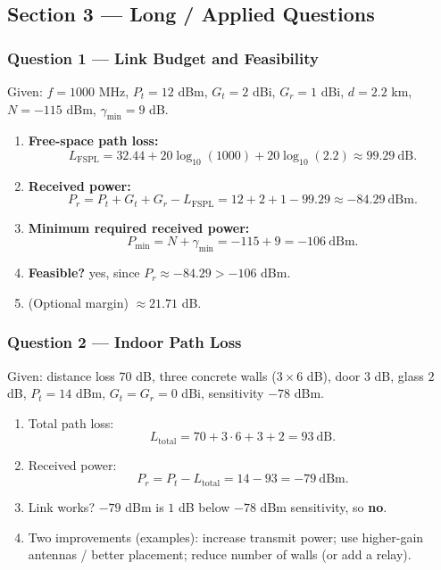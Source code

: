 \documentclass[11pt,a4paper]{article}
\begin{document}
\subsection*{Section 3 --- Long / Applied Questions}

\subsubsection*{Question 1 --- Link Budget and Feasibility}
Given: $f=1000$ MHz, $P_t=12$ dBm, $G_t=2$ dBi, $G_r=1$ dBi, $d=2.2$ km, $N=-115$ dBm, $\gamma_{\min}=9$ dB.

\begin{enumerate}[label=\alph*.]
    \item \textbf{Free-space path loss:}
    \[
    L_{\mathrm{FSPL}}=32.44+20\log_{10}(1000)+20\log_{10}(2.2)\approx 99.29\ \mathrm{dB}.
    \]
    \item \textbf{Received power:}
    \[
    P_r=P_t+G_t+G_r-L_{\mathrm{FSPL}}=12+2+1-99.29\approx -84.29\ \mathrm{dBm}.
    \]
    \item \textbf{Minimum required received power:}
    \[
    P_{\min}=N+\gamma_{\min}=-115+9=-106\ \mathrm{dBm}.
    \]
    \item \textbf{Feasible?} yes, since $P_r\approx -84.29 > -106$ dBm.
    \item (Optional margin) $\approx 21.71$ dB.
    
\end{enumerate}

\subsubsection*{Question 2 --- Indoor Path Loss}
Given: distance loss $70$ dB, three concrete walls ($3\times 6$ dB), door $3$ dB, glass $2$ dB, $P_t=14$ dBm, $G_t=G_r=0$ dBi, sensitivity $-78$ dBm.

\begin{enumerate}[label=\alph*.]
    \item Total path loss:
    \[
    L_{\text{total}}=70+3\cdot 6+3+2=93\ \mathrm{dB}.
    \]
    \item Received power:
    \[
    P_r=P_t-L_{\text{total}}=14-93=-79\ \mathrm{dBm}.
    \]
    \item Link works? $-79$ dBm is $1$ dB below $-78$ dBm sensitivity, so \textbf{no}.
    \item Two improvements (examples): increase transmit power; use higher-gain antennas / better placement; reduce number of walls (or add a relay).
\end{enumerate}
\end{document}
